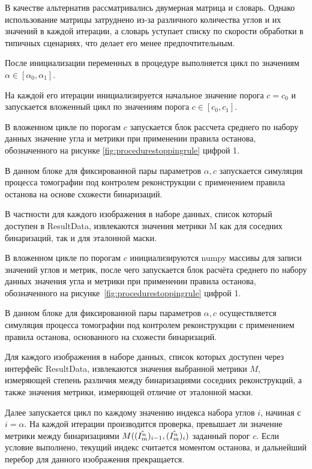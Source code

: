 В качестве альтернатив рассматривались двумерная матрица и словарь. Однако использование матрицы затруднено из-за различного количества углов и их значений в каждой итерации, а словарь уступает списку по скорости обработки в типичных сценариях, что делает его менее предпочтительным.

После инициализации переменных в процедуре выполняется цикл по значениям \(\alpha \in [\alpha_0, \alpha_1]\).

На каждой его итерации инициализируется начальное значение порога \(c = c_0\) и запускается вложенный цикл по значениям порога \(c \in [c_0, c_1]\).

В вложенном цикле по порогам \(c\) запускается блок рассчета среднего по набору данных значение угла и метрики при применении правила останова, обозначенного на рисунке \ref*{fig:procedurestoppingrule} цифрой 1.

В данном блоке для фиксированной пары параметров \(\alpha, c\) запускается симуляция процесса томографии под контролем реконструкции с применением правила останова на основе схожести бинаризаций.

В частности для каждого изображения в наборе данных, список который доступен в ResultData, извлекаются значения метрики M как для соседних бинаризаций, так и для эталонной маски.

В вложенном цикле по порогам \(c\) инициализируются numpy массивы для записи значений углов и метрик, после чего запускается блок расчёта среднего по набору данных значения угла и метрики при применении правила останова, обозначенного на рисунке~\ref*{fig:procedurestoppingrule} цифрой 1.

В данном блоке для фиксированной пары параметров \(\alpha, c\) осуществляется симуляция процесса томографии под контролем реконструкции с применением правила останова, основанного на схожести бинаризаций.

Для каждого изображения в наборе данных, список которых доступен через интерфейс ResultData, извлекаются значения выбранной метрики \(M\), измеряющей степень различия между бинаризациями соседних реконструкций, а также значения метрики, измеряющей отличие от эталонной маски.

Далее запускается цикл по каждому значению индекса набора углов \(i\), начиная с \(i = \alpha\). На каждой итерации производится проверка, превышает ли значение метрики между бинаризациями \(M((\hat{I^n_m})_{i-1}, (\hat{I^n_m})_i)\) заданный порог \(c\). Если условие выполнено, текущий индекс считается моментом останова, и дальнейший перебор для данного изображения прекращается.

